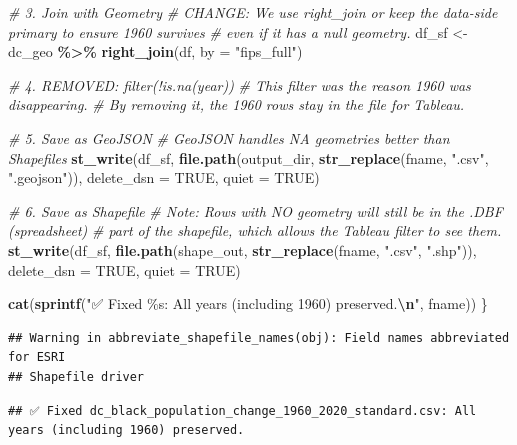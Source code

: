 \documentclass[
]{article}
\newenvironment{Shaded}{\begin{snugshade}}{\end{snugshade}}
\newcommand{\AttributeTok}[1]{\textcolor[rgb]{0.13,0.29,0.53}{#1}}
\newcommand{\CommentTok}[1]{\textcolor[rgb]{0.56,0.35,0.01}{\textit{#1}}}
\newcommand{\ConstantTok}[1]{\textcolor[rgb]{0.56,0.35,0.01}{#1}}
\newcommand{\FunctionTok}[1]{\textcolor[rgb]{0.13,0.29,0.53}{\textbf{#1}}}
\newcommand{\NormalTok}[1]{#1}
\newcommand{\OtherTok}[1]{\textcolor[rgb]{0.56,0.35,0.01}{#1}}
\newcommand{\SpecialCharTok}[1]{\textcolor[rgb]{0.81,0.36,0.00}{\textbf{#1}}}
\newcommand{\StringTok}[1]{\textcolor[rgb]{0.31,0.60,0.02}{#1}}
\begin{document}
\begin{Shaded}
\begin{Highlighting}[]
  \CommentTok{\# 3. Join with Geometry}
  \CommentTok{\# CHANGE: We use right\_join or keep the data{-}side primary to ensure 1960 survives}
  \CommentTok{\# even if it has a \textquotesingle{}null\textquotesingle{} geometry.}
\NormalTok{  df\_sf }\OtherTok{\textless{}{-}}\NormalTok{ dc\_geo }\SpecialCharTok{\%\textgreater{}\%} 
    \FunctionTok{right\_join}\NormalTok{(df, }\AttributeTok{by =} \StringTok{"fips\_full"}\NormalTok{) }

  \CommentTok{\# 4. REMOVED: filter(!is.na(year)) }
  \CommentTok{\# This filter was the reason 1960 was disappearing. }
  \CommentTok{\# By removing it, the 1960 rows stay in the file for Tableau.}
  
  \CommentTok{\# 5. Save as GeoJSON}
  \CommentTok{\# GeoJSON handles NA geometries better than Shapefiles}
  \FunctionTok{st\_write}\NormalTok{(df\_sf, }\FunctionTok{file.path}\NormalTok{(output\_dir, }\FunctionTok{str\_replace}\NormalTok{(fname, }\StringTok{".csv"}\NormalTok{, }\StringTok{".geojson"}\NormalTok{)), }
           \AttributeTok{delete\_dsn =} \ConstantTok{TRUE}\NormalTok{, }\AttributeTok{quiet =} \ConstantTok{TRUE}\NormalTok{)}
  
  \CommentTok{\# 6. Save as Shapefile}
  \CommentTok{\# Note: Rows with NO geometry will still be in the .DBF (spreadsheet) }
  \CommentTok{\# part of the shapefile, which allows the Tableau filter to see them.}
  \FunctionTok{st\_write}\NormalTok{(df\_sf, }\FunctionTok{file.path}\NormalTok{(shape\_out, }\FunctionTok{str\_replace}\NormalTok{(fname, }\StringTok{".csv"}\NormalTok{, }\StringTok{".shp"}\NormalTok{)), }
           \AttributeTok{delete\_dsn =} \ConstantTok{TRUE}\NormalTok{, }\AttributeTok{quiet =} \ConstantTok{TRUE}\NormalTok{)}
  
  \FunctionTok{cat}\NormalTok{(}\FunctionTok{sprintf}\NormalTok{(}\StringTok{"✅ Fixed \%s: All years (including 1960) preserved.}\SpecialCharTok{\textbackslash{}n}\StringTok{"}\NormalTok{, fname))}
\NormalTok{\}}
\end{Highlighting}
\end{Shaded}

\begin{verbatim}
## Warning in abbreviate_shapefile_names(obj): Field names abbreviated for ESRI
## Shapefile driver
\end{verbatim}

\begin{verbatim}
## ✅ Fixed dc_black_population_change_1960_2020_standard.csv: All years (including 1960) preserved.
\end{verbatim}
\end{document}
